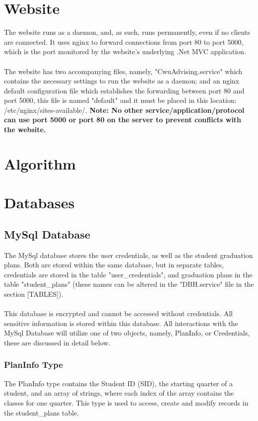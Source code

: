 \documentclass[letterpaper]{report}
\begin{document}
	\chapter{Website}
	The website runs as a daemon, and, as such, runs permanently, even if no clients are connected. It uses nginx to forward connections from port 80 to port 5000, which is the port monitored by the website's underlying .Net MVC application.\\ \\ The website has two accompanying files, namely, "CwuAdvising.service" which contains the necessary settings to run the website as a daemon; and an nginx default configuration file which establishes the forwarding between port 80 and port 5000, this file is named "default" and it must be placed in this location: /etc/nginx/sites-available/. \textbf{Note: No other service/application/protocol can use port 5000 or port 80 on the server to prevent conflicts with the website.}
	\chapter{Algorithm}
	\chapter{Databases}
	\section{MySql Database}
	The MySql database stores the user credentials, as well as the student graduation plans. Both are stored within the same database, but in separate tables, credentials are stored in the table "user\_credentials", and graduation plans in the table "student\_plans" (these names can be altered in the "DBH.service" file in the section [TABLES]).\\ \\This database is encrypted and cannot be accessed without credentials. All sensitive information is stored within this database.
	All interactions with the MySql Database will utilize one of two objects, namely, PlanInfo, or Credentials, these are discussed in detail below.
	\subsection{PlanInfo Type}
	The PlanInfo type contains the Student ID (SID), the starting quarter of a student, and an array of strings, where each index of the array contains the classes for one quarter. This type is used to access, create and modify records in the student\_plans table. 
\end{document}
